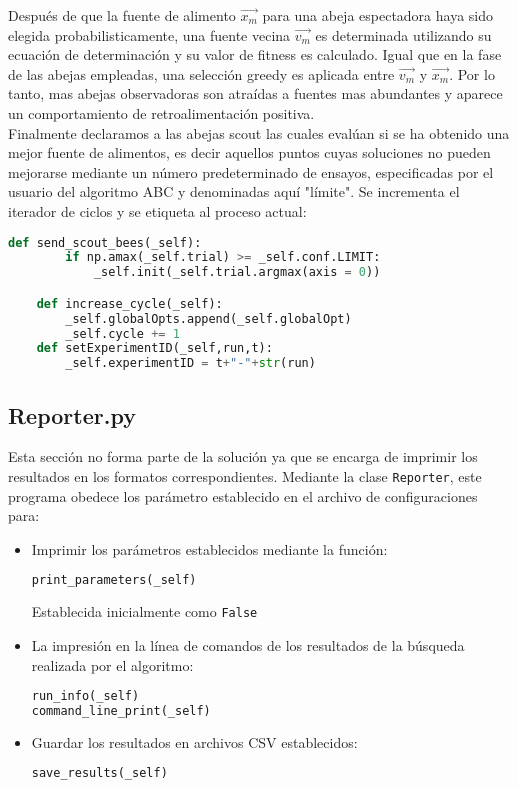 \documentclass{article}
\begin{document}
Después de que la fuente de alimento $\vec{x_m}$ para una abeja espectadora haya sido elegida probabilisticamente, una fuente vecina $\vec{v_m}$ es determinada utilizando su ecuación de determinación y su valor de fitness es calculado. Igual que en la fase de las abejas empleadas, una selección greedy es aplicada entre $\vec{v_m}$ y $\vec{x_m}$. Por lo tanto, mas abejas observadoras son atraídas a fuentes mas abundantes y aparece un comportamiento de retroalimentación positiva. \\


Finalmente declaramos a las abejas scout las cuales evalúan si se ha obtenido una mejor fuente de alimentos, es decir aquellos puntos cuyas soluciones no pueden mejorarse mediante un número predeterminado de ensayos, especificadas por el usuario del algoritmo ABC y denominadas aquí "límite". Se incrementa el iterador de ciclos y se etiqueta al proceso actual:

\begin{lstlisting}[language=Python]
    def send_scout_bees(_self):
        if np.amax(_self.trial) >= _self.conf.LIMIT:
            _self.init(_self.trial.argmax(axis = 0))

    def increase_cycle(_self):
        _self.globalOpts.append(_self.globalOpt)
        _self.cycle += 1
    def setExperimentID(_self,run,t):
        _self.experimentID = t+"-"+str(run)
\end{lstlisting}

\subsection*{Reporter.py}

Esta sección no forma parte de la solución ya que se encarga de imprimir los resultados en los formatos correspondientes. Mediante la clase \texttt{Reporter}, este programa obedece los parámetro establecido en el archivo de configuraciones para:
\begin{itemize}
    \item Imprimir los parámetros establecidos mediante la función:
\begin{lstlisting}[language=Python]
print_parameters(_self)
\end{lstlisting}
Establecida inicialmente como \texttt{False}

\item La impresión en la línea de comandos de los resultados de la búsqueda realizada por el algoritmo:
\begin{lstlisting}[language=Python]
run_info(_self)
command_line_print(_self)
\end{lstlisting}

\item Guardar los resultados en archivos CSV establecidos:

\begin{lstlisting}[language=Python]
save_results(_self)
\end{lstlisting}



\end{itemize}
\end{document}
